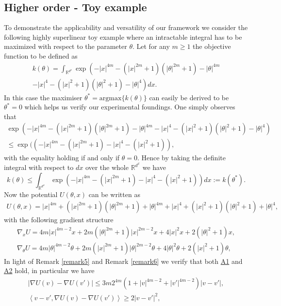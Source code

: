 \documentclass[a4paper, 10pt]{article}
\theoremstyle{plain}%
\begin{document}
\subsection{Higher order - Toy example}\label{toy}
To demonstrate the applicability and versatility of our framework we consider the following highly superlinear toy example where an intractable integral has to be maximized with respect to the parameter $\theta$. Let for any $m\geq1$ the objective function to be defined as
\begin{align*} k(\theta)=\int_{\mathbb{R}^{d^x}}\exp\left(-|x|^{4m}-(|x|^{2m}+1)(|\theta|^{2m}+1)-|\theta|^{4m}\right.\\ \left.-|x|^4-(|x|^2+1)(|\theta|^2+1)-|\theta|^4\right)dx.\end{align*}
In this case the maximiser $\theta^*=\text{argmax}\{k(\theta)\}$ can easily be derived to be $\theta^*=0$ which helps us verify our experimental foundings. \noindent One simply observes that \begin{gather*}\exp\left(-|x|^{4m}-(|x|^{2m}+1)(|\theta|^{2m}+1)-|\theta|^{4m}-|x|^4-(|x|^2+1)(|\theta|^2+1)-|\theta|^4\right)\\\leq \exp(\left(-|x|^{4m}-(|x|^{2m}+1)-|x|^4-(|x|^2+1)\right),\end{gather*}
with the equality holding if and only if $\theta=0$. Hence by taking the definite integral with respect to $dx$ over the whole $\mathbb{R}^{d^x}$ we have
$$k(\theta)\leq \int_{\mathbb{R}^{d^x}}\exp{\left(-|x|^{4m}-(|x|^{2m}+1)-|x|^4-(|x|^2+1)\right)}dx:=k(\theta^*).$$
Now the potential $U(\theta,x)$ can be written as
\begin{align}U(\theta,x)=|x|^{4m}+(|x|^{2m}+1)(|\theta|^{2m}+1)+|\theta|^{4m}+|x|^4+(|x|^2+1)(|\theta|^2+1)+|\theta|^4,\label{toyU}\end{align}
with the following gradient structure
\begin{gather*} 
\nabla_{x}U=4m|x|^{4m-2}x+2m(|\theta|^{2m}+1)|x|^{2m-2}x+4|x|^2x+2(|\theta|^2+1)x,\\
\nabla_{\theta}U=4m|\theta|^{4m-2}\theta+2m(|x|^{2m}+1)|\theta|^{2m-2}\theta+4|\theta|^2\theta+2(|x|^2+1)\theta,
\end{gather*}
\noindent In light of Remark \ref{remark5} and Remark \ref{remark6} we verify that both \hyperlink{Assum1}{A1} and \hyperlink{Assum2}{A2} hold, in particular we have
\begin{gather*}
    |\nabla U(v)-\nabla U(v')|\leq3m2^{4m}\left(1+|v|^{4m-2}+|v'|^{4m-2}\right)|v-v'|,\\
    \left\langle v-v',\nabla U(v)-\nabla U(v')\right\rangle\geq 2|v-v'|^2,
\end{gather*}
\end{document}
